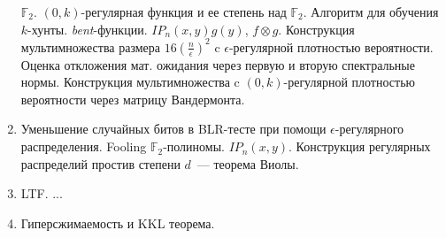 \begin{enumerate}
        $\mathbb{F}_2$. $(0, k)$-регулярная функция и ее степень над $\mathbb{F}_2$. Алгоритм для обучения
        $k$-хунты. \textit{bent}-функции. $IP_n(x, y) g(y)$, $f \otimes g$. Конструкция мультимножества размера $16
        (\frac{n}{\epsilon})^2$ c $\epsilon$-регулярной плотностью вероятности. Оценка откложения мат. ожидания через первую и
        вторую спектральные нормы. Конструкция мультимножества c $(0, k)$-регулярной плотностью вероятности через матрицу
        Вандермонта.
    \item Уменьшение случайных битов в BLR-тесте при помощи $\epsilon$-регулярного распределения. Fooling
        $\mathbb{F}_2$-полиномы. $IP_n(x, y)$. Конструкция регулярных распределий простив степени $d$~--- теорема Виолы.
    \item LTF. ...
    \item Гиперсжимаемость и KKL теорема.
\end{enumerate}